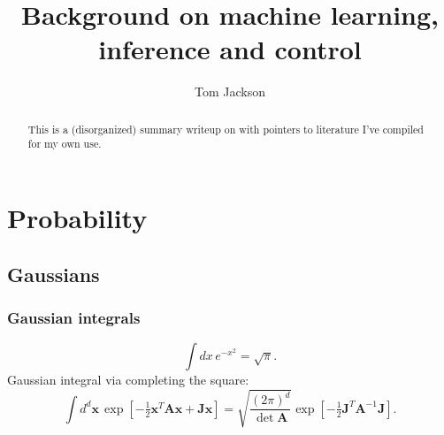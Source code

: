 \documentclass[notitlepage,openany,11pt]{report}
\makeatletter
\numberwithin{equation}{section}
\newcommand*{\toccontents}{\@starttoc{toc}}
\theoremstyle{plain}%
\makeatother
\begin{document}
\newcommand {\be}{\begin{equation*}}
\newcommand {\ee} {\end{equation*}}
\newcommand{\boldref}[1]{\textbf{\ref{#1}}}
\newcommand{\boldnameref}[1]{\textbf{\nameref{#1}}}

\newcommand{\mbf}[1]{\mathbf{#1}}
\newcommand{\mbb}[1]{\mathbb{#1}}
\newcommand{\mcal}[1]{\mathcal{#1}}
\newcommand{\mtilde}[1]{\widetilde{#1}}
\newcommand{\mhat}[1]{\widehat{#1}}
\newcommand{\mol}[1]{\overline{#1}}



\title{Background on machine learning, inference and control}
\author{Tom Jackson}

\hypersetup{pageanchor=false} %

\maketitle

\begin{abstract}
This is a (disorganized) summary writeup on with pointers to literature I've compiled for my own use.\end{abstract}

\hypersetup{pageanchor=true}

\toccontents

\restoregeometry


\chapter{Probability}

\section{Gaussians}

\subsection{Gaussian integrals}
\be
\int \! dx \, e^{-x^{2}} = \sqrt{\pi}.
\ee
Gaussian integral via completing the square:
\be
\int \! d^{d}\mbf{x} \, \exp \left[ - \tfrac{1}{2} \mbf{x}^{T} \mbf{A} \mbf{x} + \mbf{Jx} \right] = \sqrt{\frac{(2 \pi)^{d}}{\det \mbf{A}}} \exp \left[ - \tfrac{1}{2} \mbf{J}^{T} \mbf{A}^{-1} \mbf{J} \right].
\ee
\end{document}
